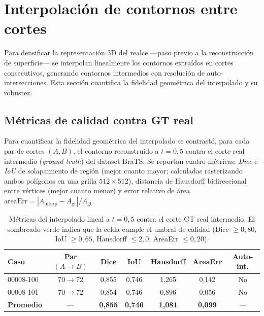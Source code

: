 \documentclass[conference]{IEEEtran}
\newcommand{\cg}[1]{\cellcolor{cellgood}#1}   %
\begin{document}
\section{Interpolación de contornos entre cortes}
\label{sec:interp}
Para densificar la representación 3D del realce ---paso previo a la
reconstrucción de superficie--- se interpolan linealmente los contornos
extraídos en cortes consecutivos, generando contornos intermedios con
resolución de auto-intersecciones. Esta sección cuantifica la fidelidad
geométrica del interpolado y su robustez.

\subsection{Métricas de calidad contra GT real}
\label{subsec:metricas-gt}
Para cuantificar la fidelidad geométrica del interpolado se contrastó, para
cada par de cortes $(A, B)$, el contorno reconstruido a $t = 0{,}5$ contra el
corte real intermedio (\emph{ground truth}) del dataset BraTS. Se reportan
cuatro métricas: \emph{Dice} e \emph{IoU} de solapamiento de región (mejor
cuanto mayor; calculadas rasterizando ambos polígonos en una grilla
$512\!\times\!512$), distancia de Hausdorff bidireccional entre vértices
(mejor cuanto menor) y error relativo de área
$\mathrm{areaErr}=|A_{\text{interp}}-A_{\text{gt}}|/A_{\text{gt}}$.

\begin{table}[h]
  \centering
  \small
  \setlength{\tabcolsep}{4pt}
  \caption{Métricas del interpolado lineal a $t=0{,}5$ contra el corte GT real
  intermedio. El sombreado verde indica que la celda cumple el umbral de
  calidad (Dice $\geq 0{,}80$, IoU $\geq 0{,}65$, Hausdorff $\leq 2{,}0$,
  AreaErr $\leq 0{,}20$).}
  \label{tab:metricas-gt}
  \begin{tabular}{lcccccc}
    \toprule
    Caso & Par $(A \!\to\! B)$ & Dice & IoU & Hausdorff & AreaErr & Auto-int. \\
    \midrule
    00008-100 & $70 \!\to\! 72$ &
      \cg{0,855} & \cg{0,746} & \cg{1,265} & \cg{0,142} & No \\
    00008-101 & $70 \!\to\! 72$ &
      \cg{0,854} & \cg{0,746} & \cg{0,896} & \cg{0,056} & No \\
    \midrule
    \textbf{Promedio} & --- &
      \textbf{0,855} & \textbf{0,746} & \textbf{1,081} & \textbf{0,099} & --- \\
    \bottomrule
  \end{tabular}
\end{table}
\end{document}

